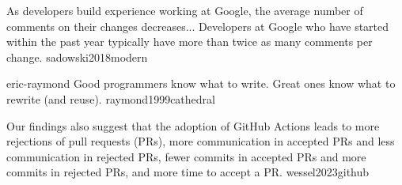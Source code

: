 \documentclass{article}
\begin{document}
  {As developers build experience working at Google, the average number of comments on their changes decreases... Developers at Google who have started within the past year typically have more than twice as many comments per change.}
  {sadowski2018modern}

\qte
  {eric-raymond}
  {Good programmers know what to write. Great ones know what to rewrite (and reuse).}
  {raymond1999cathedral}



  {Our findings also suggest that the adoption of GitHub Actions leads to more rejections of pull requests (PRs), more communication in accepted PRs and less communication in rejected PRs, fewer commits in accepted PRs and more commits in rejected PRs, and more time to accept a PR.}
  {wessel2023github}




\end{document}
